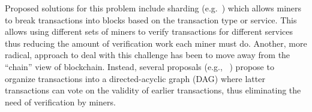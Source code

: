 Proposed solutions for this problem include sharding (e.g.~\cite{CCS:LNZBGS16, FC:GenRenSir17}) which allows miners to break transactions into blocks based on the transaction type or service.  This allows using different sets of miners to verify transactions for different services thus reducing the amount of verification work each miner must do.  Another, more radical, approach to deal with this challenge has been to move away from the ``chain'' view of blockchain.  Instead, several proposals (e.g., ~\cite{ePrint:SomLewZoh16,eprint:SomZoh18,IOTA}) propose to organize transactions into a directed-acyclic graph (DAG) where latter transactions can vote on the validity of earlier transactions, thus eliminating the need of verification by miners.
%
%

